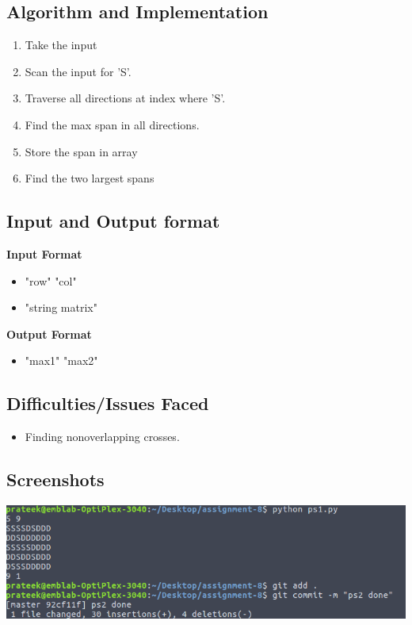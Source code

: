 \documentclass{article}
\begin{document}
\subsection{Algorithm and Implementation}
\begin{enumerate}
\item Take the input
\item Scan the input for 'S'.
\item Traverse all directions at index where 'S'.
\item Find the max span in all directions.
\item Store the span in array
\item Find the two largest spans  
\end{enumerate}
\subsection{Input and Output format}

\textbf{Input Format} 
\begin{itemize}
\item "row" "col"
\item "string matrix"
\end{itemize}

\noindent \textbf{Output Format} 
\begin{itemize}
\item "max1" "max2"
\end{itemize}

\subsection{Difficulties/Issues Faced}
\begin{itemize}
\item Finding nonoverlapping crosses.  
\end{itemize}

\subsection{Screenshots}
\includegraphics[scale = 0.5]{ps1}\\ \\
\end{document}
